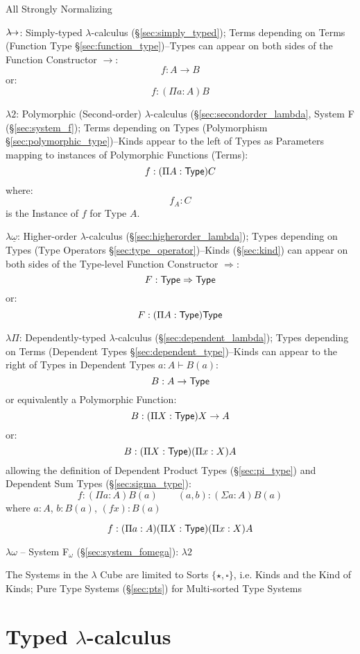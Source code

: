 All Strongly Normalizing

$\lambda\kern-5pt\rightarrow$: Simply-typed $\lambda$-calculus
(\S\ref{sec:simply_typed}); Terms depending on Terms (Function Type
\S\ref{sec:function_type})--Types can appear on both sides of the
Function Constructor $\rightarrow$:
\[
  f:A \rightarrow B
\]
or:
\[
  f:(\Pi a:A)B
\]

$\lambda2$: Polymorphic (Second-order) $\lambda$-calculus
(\S\ref{sec:secondorder_lambda}, System F (\S\ref{sec:system_f});
Terms depending on Types (Polymorphism
\S\ref{sec:polymorphic_type})--Kinds appear to the left of Types as
Parameters mapping to instances of Polymorphic Functions (Terms):
\[
  f:(\Pi A:\mathsf{Type}) C
\]
where:
\[
  f_A : C
\]
is the Instance of $f$ for Type $A$.

$\lambda\underline{\omega}$: Higher-order $\lambda$-calculus
(\S\ref{sec:higherorder_lambda}); Types depending on Types (Type
Operators \S\ref{sec:type_operator})--Kinds (\S\ref{sec:kind}) can
appear on both sides of the Type-level Function Constructor
$\Rightarrow$:
\[
   F:\mathsf{Type} \Rightarrow \mathsf{Type}
\]
or:
\[
  F:(\Pi A:\mathsf{Type}) \mathsf{Type}
\]

$\lambda\Pi$: Dependently-typed $\lambda$-calculus
(\S\ref{sec:dependent_lambda}); Types depending on Terms (Dependent
Types \S\ref{sec:dependent_type})--Kinds can appear to the right of
Types in Dependent Types $a:A \vdash B(a)$:
\[
  B : A \rightarrow \mathsf{Type}
\]
or equivalently a Polymorphic Function:
\[
  B : (\Pi X:\mathsf{Type}) X \rightarrow A
\]
or:
\[
  B : (\Pi X:\mathsf{Type}) (\Pi x:X) A
\]
allowing the definition of Dependent Product Types
(\S\ref{sec:pi_type}) and Dependent Sum Types
(\S\ref{sec:sigma_type}):
\[
  f : (\Pi a:A) B(a) \quad\quad (a,b) : (\Sigma a:A) B(a)
\]
where $a:A$, $b:B(a)$, $(f x):B(a)$

\[
  f : (\Pi a:A) (\Pi X:\mathsf{Type}) (\Pi x:X) A
\]

$\lambda\omega$ -- System F$_\omega$ (\S\ref{sec:system_fomega}): $\lambda2$

\fist The Systems in the $\lambda$ Cube are limited to Sorts
$\{\star,\square\}$, i.e. Kinds and the Kind of Kinds; Pure Type
Systems (\S\ref{sec:pts}) for Multi-sorted Type Systems %



\section{Typed $\lambda$-calculus}\label{sec:typed_lambda}

